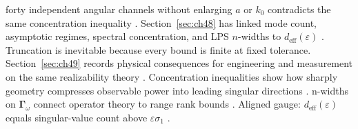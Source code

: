 forty independent angular channels without enlarging $a$ or $k_{0}$ contradicts the same concentration inequality
\cite{collin2001}.
Section~\ref{sec:ch48} has linked mode count, asymptotic regimes, spectral concentration, and LPS \(n\)-widths to \(d_{\mathrm{eff}}(\varepsilon)\)
\cite{stratton1941}. Truncation is inevitable because every bound is finite at fixed tolerance.
Section~\ref{sec:ch49} records physical consequences for engineering and measurement on the same realizability theory \cite{stratton1941}.
Concentration inequalities show how sharply geometry compresses observable power into leading singular directions \cite{hansen1988}.
n-widths on $\boldsymbol{\Gamma}_\omega$ connect operator theory to range rank bounds \cite{landau1962}. Aligned gauge: $d_{\mathrm{eff}}(\varepsilon)$ equals singular-value count above $\varepsilon\sigma_1$ \cite{stratton1941}.
\medskip
